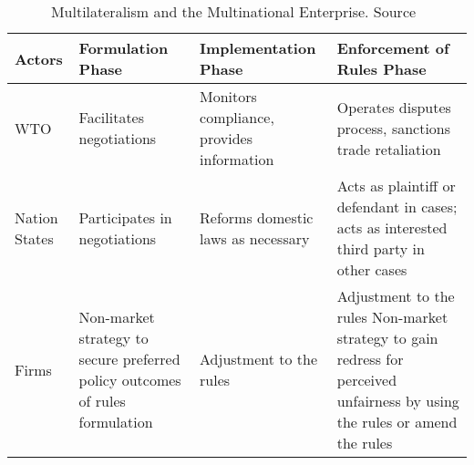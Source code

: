 \begin{table}[htb]
  \centering
  \caption[Multilateralism and the Multinational Enterprise]{Multilateralism and the Multinational Enterprise. Source~\cite{Lawton:2009vw}}\label{tab:lawton:2009}%
\begin{tabularx}{0.99\textwidth}{lXXX} 
Actors &
Formulation Phase &
Implementation Phase &
Enforcement of Rules Phase \\
  \toprule 
 WTO &
Facilitates negotiations &
Monitors compliance, provides information &
Operates disputes process, sanctions trade retaliation \\

Nation States &
Participates in negotiations &
Reforms domestic laws as necessary &
Acts as plaintiff or defendant in cases; acts as interested third party in other cases\\ 

Firms &
Non-market strategy to secure preferred policy outcomes of rules formulation &
Adjustment to the rules &
Adjustment to the rules \newline
Non-market strategy to gain redress for perceived unfairness by using the rules or amend the rules\\ 
  \bottomrule
\end{tabularx}
\end{table}







